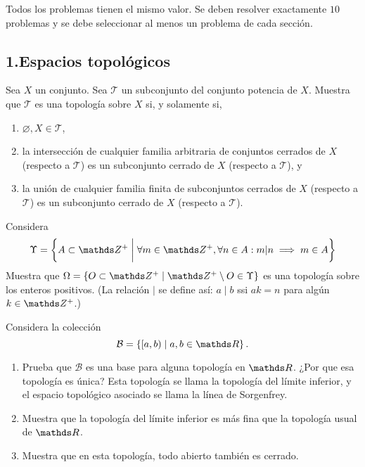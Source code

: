 \documentclass[b5paper,10pt,twoside]{book}
\begin{document}
\def\thetitle{Examen final}
\def\fechaentrega{31 de enero de 2025}


Todos los problemas tienen el mismo valor.
Se deben resolver exactamente \(10\) problemas
y se debe seleccionar  al menos un problema de cada sección.



\subsection*{1.\enspace Espacios topológicos}


\begin{problem}
Sea \(X\) un conjunto.
Sea \(\mathcal{T}\) un subconjunto del conjunto potencia de \(X\).
Muestra que \(\mathcal{T}\) es una topología sobre \(X\) si, y solamente si,
\begin{enumerate}[label=(\roman*)]
\item \(\varnothing, X\in \mathcal{T}\),
\item la intersección de cualquier familia arbitraria de conjuntos cerrados de \(X\) (respecto a \(\mathcal{T}\)) es un subconjunto cerrado de \(X\) (respecto a \(\mathcal{T}\)), y 
\item la unión de cualquier familia finita de subconjuntos cerrados de \(X\) (respecto a \(\mathcal{T}\)) es un subconjunto cerrado de \(X\) (respecto a \(\mathcal{T}\)).
\end{enumerate}
\end{problem}


\begin{problem}
Considera 
\[
\Upsilon  = \left\{ 
    A\subset \Z^+ \;\bigg|\; \forall m \in \Z^+, \forall n \in A :  m|n \implies m \in A
 \right\}
\]
Muestra que \( \Omega = \left\{ O \subset \Z^+ \mid \Z^+\setminus O \in \Upsilon \right\}  \) es una topología sobre los enteros positivos.
(La relación \(\mid\) se define así:  \(a\mid b\) ssi \(ak = n\) para algún   \(k\in \Z^+\).)
\end{problem}

\begin{problem}
Considera  la colección 
\[
\mathcal{B} = \left\{ 
    [a,b) \mid a,b\in\R
 \right\}.
\]
\begin{enumerate}[label=(\roman*)]
\item Prueba  que \(\mathcal{B}\) es una base para alguna topología en \(\R\). ¿Por que esa topología es única? Esta topología se llama la topología
del límite inferior,
y el espacio topológico asociado se llama 
la línea de Sorgenfrey.


\item Muestra que la  topología
del límite inferior es más fina que la topología usual de \(\R\).

\item Muestra que en esta topología, todo abierto también es cerrado.
\end{enumerate}





\end{problem}
\end{document}
